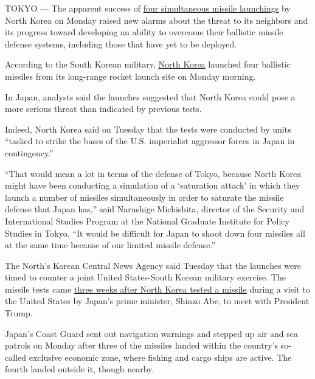 TOKYO --- The apparent success of
\href{https://www.nytimes3xbfgragh.onion/2017/03/05/world/north-korea-ballistic-missiles.html?hp\&action=click\&pgtype=Homepage\&clickSource=story-heading\&module=second-column-region\&region=top-news\&WT.nav=top-news\&_r=0}{four
simultaneous missile launchings} by North Korea on Monday raised new
alarms about the threat to its neighbors and its progress toward
developing an ability to overcome their ballistic missile defense
systems, including those that have yet to be deployed.

According to the South Korean military,
\href{http://topics.nytimes3xbfgragh.onion/top/news/international/countriesandterritories/northkorea/index.html?inline=nyt-geo}{North
Korea} launched four ballistic missiles from its long-range rocket
launch site on Monday morning.

In Japan, analysts said the launches suggested that North Korea could
pose a more serious threat than indicated by previous tests.

Indeed, North Korea said on Tuesday that the tests were conducted by
units ``tasked to strike the bases of the U.S. imperialist aggressor
forces in Japan in contingency.''

``That would mean a lot in terms of the defense of Tokyo, because North
Korea might have been conducting a simulation of a `saturation attack'
in which they launch a number of missiles simultaneously in order to
saturate the missile defense that Japan has,'' said Narushige
Michishita, director of the Security and International Studies Program
at the National Graduate Institute for Policy Studies in Tokyo. ``It
would be difficult for Japan to shoot down four missiles all at the same
time because of our limited missile defense.''

The North's Korean Central News Agency said Tuesday that the launches
were timed to counter a joint United States-South Korean military
exercise. The missile tests came
\href{https://www.nytimes3xbfgragh.onion/2017/02/11/world/asia/north-korea-missile-test-trump.html}{three
weeks after North Korea tested a missile} during a visit to the United
States by Japan's prime minister, Shinzo Abe, to meet with President
Trump.

Japan's Coast Guard sent out navigation warnings and stepped up air and
sea patrols on Monday after three of the missiles landed within the
country's so-called exclusive economic zone, where fishing and cargo
ships are active. The fourth landed outside it, though nearby.

